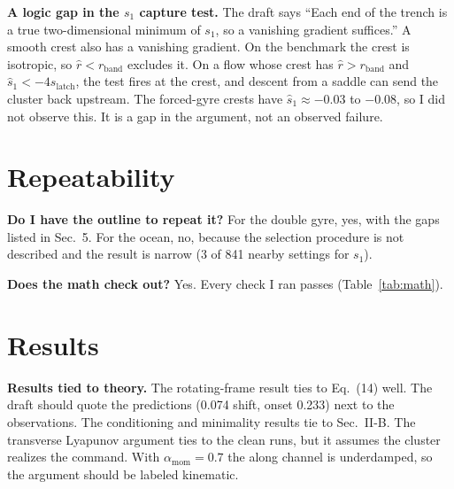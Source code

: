 \documentclass[10.5pt]{article}
\newcommand{\shat}{\hat{s}_1}
\begin{document}
\textbf{A logic gap in the $s_1$ capture test.} The draft says ``Each end of the trench is a true two-dimensional minimum of $s_1$, so a vanishing gradient suffices.'' A smooth crest also has a vanishing gradient. On the benchmark the crest is isotropic, so $\hat r<r_{\mathrm{band}}$ excludes it. On a flow whose crest has $\hat r>r_{\mathrm{band}}$ and $\shat<-4s_{\mathrm{latch}}$, the test fires at the crest, and descent from a saddle can send the cluster back upstream. The forced-gyre crests have $\shat\approx-0.03$ to $-0.08$, so I did not observe this. It is a gap in the argument, not an observed failure.

\section{Repeatability}

\textbf{Do I have the outline to repeat it?} For the double gyre, yes, with the gaps listed in Sec.~5. For the ocean, no, because the selection procedure is not described and the result is narrow (3 of 841 nearby settings for $s_1$).

\textbf{Does the math check out?} Yes. Every check I ran passes (Table~\ref{tab:math}).

\section{Results}

\textbf{Results tied to theory.} The rotating-frame result ties to Eq.~(14) well. The draft should quote the predictions (0.074 shift, onset 0.233) next to the observations. The conditioning and minimality results tie to Sec.~II-B. The transverse Lyapunov argument ties to the clean runs, but it assumes the cluster realizes the command. With $\alpha_{\mathrm{mom}}=0.7$ the along channel is underdamped, so the argument should be labeled kinematic.
\end{document}

